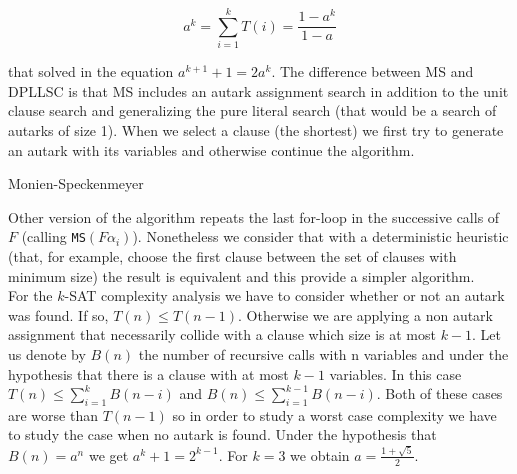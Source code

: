 $$a^k = \sum_{i=1}^kT(i) = \frac{1-a^k}{1-a}$$

that solved in the equation $a^{k+1}+1 = 2a^k$. The difference between MS and DPLLSC is that MS includes an autark assignment search in addition to the unit clause search and generalizing the pure literal search (that would be a search of autarks of size 1). When we select a clause (the shortest) we first try to generate an autark with its variables and otherwise continue the algorithm.


\begin{algorithm}
  \caption{Monien-Speckenmeyer}\label{MS}
  \begin{algorithmic}[1]
     
    \EndIf
     
    \EndIf
    \State
     \Return $MS(F\{l\to 1\})$
    \EndIf
     \Return $MS(F\{l\to 1\}})$
  \EndIf
  \State Choose the shortest clause $C = \{u_1,...,u_m\}$
  \For{$i \in \{1,...,m\}$ }
  \State $\alpha_1 := \{u_1\to 0,...,u_{i-1}\to 0,u_i\to 1\}$
  \If{$\alpha_i$ is autark } \Return \texttt{MS}$(F\alpha_i)$
  \EndIf
  \EndFor
  \If{\texttt{MS}$(F\{u_1=1\})$} \Return 1
  \EndIf
  \State \Return $MS(F\{u_1=0\})$
\end{algorithmic}
\end{algorithm}


Other version of the algorithm repeats the last for-loop  in the successive calls of $F$ (calling \texttt{MS}$(F\alpha_i)$). Nonetheless we consider that with a deterministic heuristic (that, for example, choose the first clause between the set of clauses with minimum size) the result is equivalent and this provide a simpler algorithm.\\

For the $k$-SAT complexity analysis we have to consider whether or not an autark was found. If so, $T(n) \le T(n-1)$. Otherwise we are applying a non autark assignment that necessarily collide with a clause which size is at most $k-1$. Let us denote by $B(n)$ the number of recursive calls with n variables and under the hypothesis that there is a clause with at most $k-1$ variables. In this case $T(n) \le \sum_{i=1}^{k}B(n-i)$ and $B(n) \le \sum_{i=1}^{k-1}B(n-i)$. Both of these cases are worse than $T(n-1)$ so in order to study a worst case complexity we have to study the case when no autark is found. Under the hypothesis that $B(n) = a^n$ we get $a^k+1=2^{k-1}$. For $k=3$ we obtain $a=\frac{1 + \sqrt{5}}{2}$.



